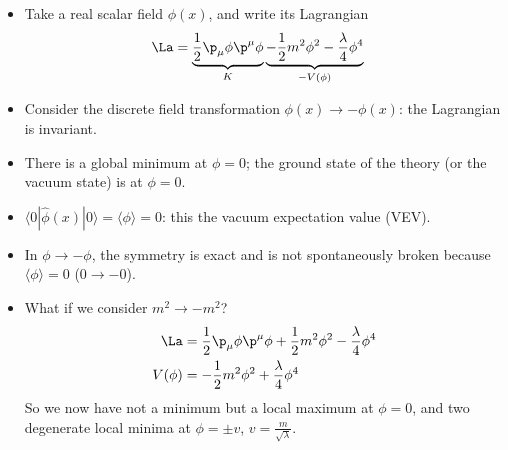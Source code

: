 \documentclass[relqm.tex]{subfiles}
\begin{document}
\begin{itemize}
    \item Take a real scalar field $\phi(x)$, and write its Lagrangian
        \begin{align}
            \La &= \underbrace{\frac12\p_\mu\phi\p^\mu\phi}_{K} \underbrace{- \frac12 m^2\phi^2 - \frac{\lambda}{4}\phi^4}_{-V(\phi)}
        \end{align}
    \item Consider the discrete field transformation $\phi(x)\to-\phi(x)$: the Lagrangian is invariant. 
        \begin{figure}[H]
            \centering
        \end{figure}
    \item There is a global minimum at $\phi=0$; the ground state of the theory (or the vacuum state) is at $\phi=0$.
    \item $\langle0|\hat{\phi}(x)|0\rangle = \langle\phi\rangle = 0$: this the vacuum expectation value (VEV).
    \item In $\phi\to-\phi$, the symmetry is exact and is not spontaneously broken because $\langle\phi\rangle=0$ ($0\to-0$). 
    \item What if we consider $m^2\to-m^2$?
        \begin{align}
            \La &= \frac12\p_\mu\phi\p^\mu\phi + \frac12m^2\phi^2 - \frac{\lambda}{4}\phi^4 \\
            V(\phi) &= -\frac12m^2\phi^2 + \frac{\lambda}{4}\phi^4
        \end{align}
        So we now have not a minimum but a local maximum at $\phi=0$, and two degenerate local minima at $\phi=\pm v$, $v=\frac{m}{\sqrt{\lambda}}$.
        \begin{figure}[H]
            \centering
\end{figure}
\end{itemize}
\end{document}
